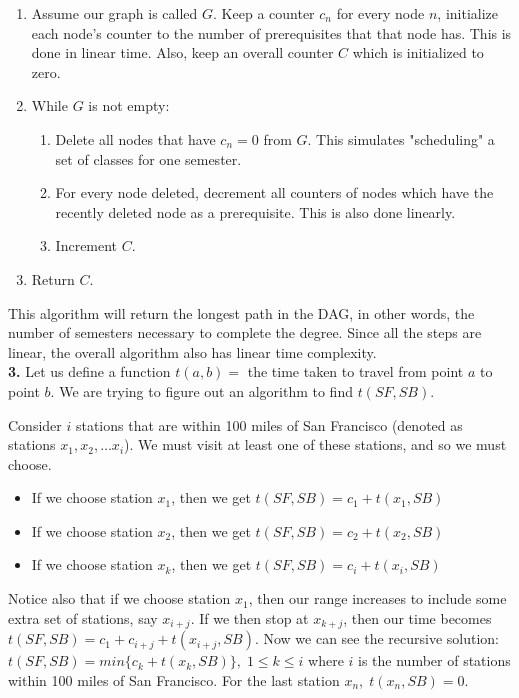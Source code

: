 \documentclass[12pt]{report}
\newcommand{\no}{\noindent}
\begin{document}
	\begin{enumerate}
		\item Assume our graph is called $G$. Keep a counter $c_n$ for every node $n$, initialize each node's counter to the number of prerequisites that that node has. This is done in linear time. Also, keep an overall counter $C$ which is initialized to zero.
		\item While $G$ is not empty:
		\begin{enumerate}
			\item Delete all nodes that have $c_n = 0$ from $G$. This simulates "scheduling" a set of classes for one semester.
			\item For every node deleted, decrement all counters of nodes which have the recently deleted node as a prerequisite. This is also done linearly.
			\item Increment $C$.
		\end{enumerate}
		\item Return $C$.
	\end{enumerate} 

	\no This algorithm will return the longest path in the DAG, in other words, the number of semesters necessary to complete the degree. Since all the steps are linear, the overall algorithm also has linear time complexity.\\

	\no \textbf{3.} Let us define a function $t(a, b) =$ the time taken to travel from point $a$ to point $b$. We are trying to figure out an algorithm to find $t(SF, SB)$. 
	
	Consider $i$ stations that are within 100 miles of San Francisco (denoted as stations $x_1, x_2, \ldots x_i$). We must visit at least one of these stations, and so we must choose. 
	\begin{itemize}
		\item If we choose station $x_1$, then we get $t(SF,SB) = c_1 + t(x_1,SB)$
		\item If we choose station $x_2$, then we get $t(SF,SB) = c_2 + t(x_2,SB)$
		\item If we choose station $x_k$, then we get $t(SF,SB) = c_i + t(x_i,SB)$
	\end{itemize}

	Notice also that if we choose station $x_1$, then our range increases to include some extra set of stations, say $x_{i+j}$. If we then stop at $x_{k+j}$, then our time becomes $t(SF,SB) = c_1 + c_{i+j} + t(x_{i+j},SB)$. Now we can see the recursive solution: $\boxed{t(SF,SB) = min\{c_k + t(x_k,SB)\},\;1 \leq k \leq i}$ where $i$ is the number of stations within 100 miles of San Francisco. For the last station $x_n, \; t(x_n,SB) = 0$.\\
\end{document}
